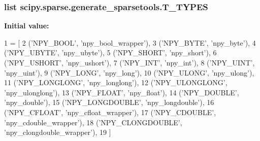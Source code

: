 \subsubsection[{T\+\_\+\+T\+Y\+P\+E\+S}]{\setlength{\rightskip}{0pt plus 5cm}list scipy.\+sparse.\+generate\+\_\+sparsetools.\+T\+\_\+\+T\+Y\+P\+E\+S}\label{namespacescipy_1_1sparse_1_1generate__sparsetools_a04396a3bf7698e500fcd31c3b8598752}
{\bfseries Initial value\+:}
\begin{DoxyCode}
1 = [
2     (\textcolor{stringliteral}{'NPY\_BOOL'}, \textcolor{stringliteral}{'npy\_bool\_wrapper'}),
3     (\textcolor{stringliteral}{'NPY\_BYTE'}, \textcolor{stringliteral}{'npy\_byte'}),
4     (\textcolor{stringliteral}{'NPY\_UBYTE'}, \textcolor{stringliteral}{'npy\_ubyte'}),
5     (\textcolor{stringliteral}{'NPY\_SHORT'}, \textcolor{stringliteral}{'npy\_short'}),
6     (\textcolor{stringliteral}{'NPY\_USHORT'}, \textcolor{stringliteral}{'npy\_ushort'}),
7     (\textcolor{stringliteral}{'NPY\_INT'}, \textcolor{stringliteral}{'npy\_int'}),
8     (\textcolor{stringliteral}{'NPY\_UINT'}, \textcolor{stringliteral}{'npy\_uint'}),
9     (\textcolor{stringliteral}{'NPY\_LONG'}, \textcolor{stringliteral}{'npy\_long'}),
10     (\textcolor{stringliteral}{'NPY\_ULONG'}, \textcolor{stringliteral}{'npy\_ulong'}),
11     (\textcolor{stringliteral}{'NPY\_LONGLONG'}, \textcolor{stringliteral}{'npy\_longlong'}),
12     (\textcolor{stringliteral}{'NPY\_ULONGLONG'}, \textcolor{stringliteral}{'npy\_ulonglong'}),
13     (\textcolor{stringliteral}{'NPY\_FLOAT'}, \textcolor{stringliteral}{'npy\_float'}),
14     (\textcolor{stringliteral}{'NPY\_DOUBLE'}, \textcolor{stringliteral}{'npy\_double'}),
15     (\textcolor{stringliteral}{'NPY\_LONGDOUBLE'}, \textcolor{stringliteral}{'npy\_longdouble'}),
16     (\textcolor{stringliteral}{'NPY\_CFLOAT'}, \textcolor{stringliteral}{'npy\_cfloat\_wrapper'}),
17     (\textcolor{stringliteral}{'NPY\_CDOUBLE'}, \textcolor{stringliteral}{'npy\_cdouble\_wrapper'}),
18     (\textcolor{stringliteral}{'NPY\_CLONGDOUBLE'}, \textcolor{stringliteral}{'npy\_clongdouble\_wrapper'}),
19 ]
\end{DoxyCode}
\hypertarget{namespacescipy_1_1sparse_1_1generate__sparsetools_a3e9ff6cfee1ff57715fbcc99081da666}{}
